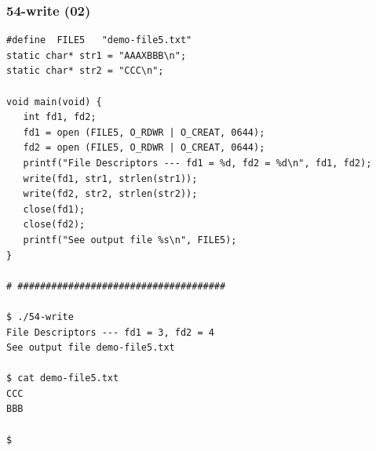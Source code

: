 \documentclass[xcolor=table, notheorems, hyperref={pdfpagelabels=false}]{beamer}
\begin{document}
\begin{frame}[fragile]
\frametitle{54-write (02)}
\begin{lstlisting}[basicstyle=\ttfamily\tiny]
#define  FILE5   "demo-file5.txt"
static char* str1 = "AAAXBBB\n";
static char* str2 = "CCC\n";

void main(void) {
   int fd1, fd2;
   fd1 = open (FILE5, O_RDWR | O_CREAT, 0644);
   fd2 = open (FILE5, O_RDWR | O_CREAT, 0644);
   printf("File Descriptors --- fd1 = %d, fd2 = %d\n", fd1, fd2);
   write(fd1, str1, strlen(str1));
   write(fd2, str2, strlen(str2));
   close(fd1);
   close(fd2);
   printf("See output file %s\n", FILE5);
}

# #####################################

$ ./54-write 
File Descriptors --- fd1 = 3, fd2 = 4
See output file demo-file5.txt

$ cat demo-file5.txt 
CCC
BBB

$ 

\end{lstlisting}
\end{frame}

\end{document}
